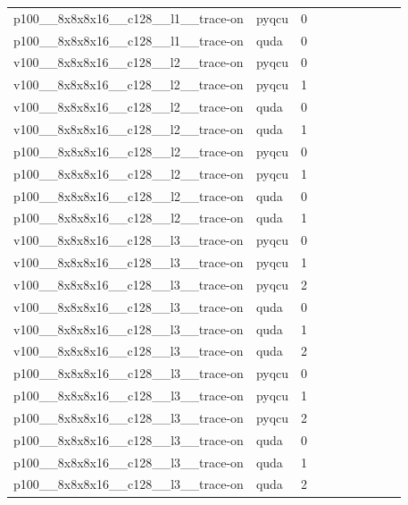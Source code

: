 \begin{table}[htbp]
\begin{tabular}{@{}llrrrrrrrr@{}}
p100\_\_8x8x8x16\_\_c128\_\_l1\_\_trace-on & pyqcu & 0 &  &  &  &  &  &  &  \\
p100\_\_8x8x8x16\_\_c128\_\_l1\_\_trace-on & quda & 0 &  &  &  &  &  &  &  \\
v100\_\_8x8x8x16\_\_c128\_\_l2\_\_trace-on & pyqcu & 0 &  &  &  &  &  &  &  \\
v100\_\_8x8x8x16\_\_c128\_\_l2\_\_trace-on & pyqcu & 1 &  &  &  &  &  &  &  \\
v100\_\_8x8x8x16\_\_c128\_\_l2\_\_trace-on & quda & 0 &  &  &  &  &  &  &  \\
v100\_\_8x8x8x16\_\_c128\_\_l2\_\_trace-on & quda & 1 &  &  &  &  &  &  &  \\
p100\_\_8x8x8x16\_\_c128\_\_l2\_\_trace-on & pyqcu & 0 &  &  &  &  &  &  &  \\
p100\_\_8x8x8x16\_\_c128\_\_l2\_\_trace-on & pyqcu & 1 &  &  &  &  &  &  &  \\
p100\_\_8x8x8x16\_\_c128\_\_l2\_\_trace-on & quda & 0 &  &  &  &  &  &  &  \\
p100\_\_8x8x8x16\_\_c128\_\_l2\_\_trace-on & quda & 1 &  &  &  &  &  &  &  \\
v100\_\_8x8x8x16\_\_c128\_\_l3\_\_trace-on & pyqcu & 0 &  &  &  &  &  &  &  \\
v100\_\_8x8x8x16\_\_c128\_\_l3\_\_trace-on & pyqcu & 1 &  &  &  &  &  &  &  \\
v100\_\_8x8x8x16\_\_c128\_\_l3\_\_trace-on & pyqcu & 2 &  &  &  &  &  &  &  \\
v100\_\_8x8x8x16\_\_c128\_\_l3\_\_trace-on & quda & 0 &  &  &  &  &  &  &  \\
v100\_\_8x8x8x16\_\_c128\_\_l3\_\_trace-on & quda & 1 &  &  &  &  &  &  &  \\
v100\_\_8x8x8x16\_\_c128\_\_l3\_\_trace-on & quda & 2 &  &  &  &  &  &  &  \\
p100\_\_8x8x8x16\_\_c128\_\_l3\_\_trace-on & pyqcu & 0 &  &  &  &  &  &  &  \\
p100\_\_8x8x8x16\_\_c128\_\_l3\_\_trace-on & pyqcu & 1 &  &  &  &  &  &  &  \\
p100\_\_8x8x8x16\_\_c128\_\_l3\_\_trace-on & pyqcu & 2 &  &  &  &  &  &  &  \\
p100\_\_8x8x8x16\_\_c128\_\_l3\_\_trace-on & quda & 0 &  &  &  &  &  &  &  \\
p100\_\_8x8x8x16\_\_c128\_\_l3\_\_trace-on & quda & 1 &  &  &  &  &  &  &  \\
p100\_\_8x8x8x16\_\_c128\_\_l3\_\_trace-on & quda & 2 &  &  &  &  &  &  &  \\

\end{tabular}
\end{table}
